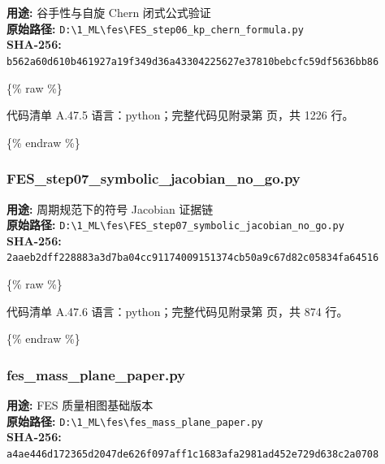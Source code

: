\documentclass[lang=cn,scheme=chinese,color=blue,device=normal,toc=onecol,math=cm]{elegantbook}
\begin{document}
\textbf{用途:} 谷手性与自旋 Chern 闭式公式验证\\ \textbf{原始路径:} \texttt{D:\textbackslash{}\allowbreak{}1\_\allowbreak{}ML\textbackslash{}\allowbreak{}fes\textbackslash{}\allowbreak{}FES\_\allowbreak{}step06\_\allowbreak{}kp\_\allowbreak{}chern\_\allowbreak{}formula.py}\\ \textbf{SHA-256:} \texttt{b562a60d610b461927a19f349d36a43304225627e37810bebcfc59df5636bb86}\par


\{\% raw \%\}\par


\begin{codeindexbox}{代码清单 A.47.5}
语言：python；完整代码见附录第 \pageref{code:47:5} 页，共 1226 行。
\end{codeindexbox}


\{\% endraw \%\}\par


\subsubsection{FES\_\allowbreak{}step07\_\allowbreak{}symbolic\_\allowbreak{}jacobian\_\allowbreak{}no\_\allowbreak{}go.py}


\textbf{用途:} 周期规范下的符号 Jacobian 证据链\\ \textbf{原始路径:} \texttt{D:\textbackslash{}\allowbreak{}1\_\allowbreak{}ML\textbackslash{}\allowbreak{}fes\textbackslash{}\allowbreak{}FES\_\allowbreak{}step07\_\allowbreak{}symbolic\_\allowbreak{}jacobian\_\allowbreak{}no\_\allowbreak{}go.py}\\ \textbf{SHA-256:} \texttt{2aaeb2dff228883a3d7ba04cc91174009151374cb50a9c67d82c05834fa64516}\par


\{\% raw \%\}\par


\begin{codeindexbox}{代码清单 A.47.6}
语言：python；完整代码见附录第 \pageref{code:47:6} 页，共 874 行。
\end{codeindexbox}


\{\% endraw \%\}\par


\subsubsection{fes\_\allowbreak{}mass\_\allowbreak{}plane\_\allowbreak{}paper.py}


\textbf{用途:} FES 质量相图基础版本\\ \textbf{原始路径:} \texttt{D:\textbackslash{}\allowbreak{}1\_\allowbreak{}ML\textbackslash{}\allowbreak{}fes\textbackslash{}\allowbreak{}fes\_\allowbreak{}mass\_\allowbreak{}plane\_\allowbreak{}paper.py}\\ \textbf{SHA-256:} \texttt{a4ae446d172365d2047de626f097aff1c1683afa2981ad452e729d638c2a0708}\par
\end{document}
